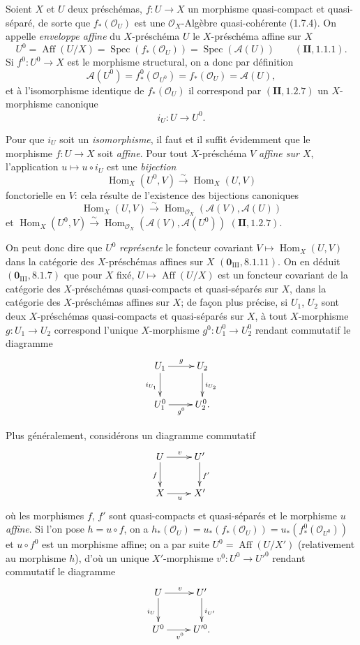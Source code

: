 \begin{env}[21.12.1]
\label{IV.21.12.1}
Soient $X$ et $U$ deux préschémas, $f:U\to X$ un morphisme quasi-compact et
quasi-séparé, de sorte que $f_*(\mathcal O_U)$ est une $\mathcal O_X$-Algèbre
quasi-cohérente (1.7.4). On appelle \emph{enveloppe affine} du $X$-préschéma $U$ le
$X$-préschéma affine sur $X$
\[
  U^0=\operatorname{Aff}(U/X)=\operatorname{Spec}(f_*(\mathcal O_U))
  =\operatorname{Spec}(\mathscr A(U))\qquad(\mathbf{II}, 1.1.1).
\]
Si $f^0:U^0\to X$ est le morphisme structural, on a donc par définition
\[
  \mathscr A(U^0)=f^0_*(\mathcal O_{U^0})=f_*(\mathcal O_U)=\mathscr A(U),
\]
et à l'isomorphisme identique de $f_*(\mathcal O_U)$ il correspond par
$(\mathbf{II}, 1.2.7)$ un $X$-morphisme canonique
\[
\label{IV.21.12.1.1}
  i_U:U\to U^0.
  \tag{21.12.1.1}
\]

Pour que $i_U$ soit un \emph{isomorphisme}, il faut et il suffit évidemment que le
morphisme $f:U\to X$ soit \emph{affine}. Pour tout $X$-préschéma $V$ \emph{affine sur
$X$}, l'application $u\mapsto u\circ i_U$ est une \emph{bijection}
\[
  \operatorname{Hom}_X(U^0,V)\xrightarrow{\sim}\operatorname{Hom}_X(U,V)
\]
fonctorielle en $V$: cela résulte de l'existence des bijections canoniques
\[
  \operatorname{Hom}_X(U,V)\xrightarrow{\sim}
  \operatorname{Hom}_{\mathcal O_X}(\mathscr A(V),\mathscr A(U))
\]
et
$\operatorname{Hom}_X(U^0,V)\xrightarrow{\sim}
\operatorname{Hom}_{\mathcal O_X}(\mathscr A(V),\mathscr A(U^0))$
$(\mathbf{II}, 1.2.7)$.

On peut donc dire que $U^0$ \emph{représente} le foncteur covariant
$V\mapsto\operatorname{Hom}_X(U,V)$ dans la catégorie des $X$-préschémas affines sur
$X$ $(\mathbf 0_{\mathrm{III}}, 8.1.11)$. On en déduit
$(\mathbf 0_{\mathrm{III}}, 8.1.7)$ que pour $X$ fixé,
$U\mapsto\operatorname{Aff}(U/X)$ est un foncteur covariant de la catégorie des
$X$-préschémas quasi-compacts et quasi-séparés sur $X$, dans la catégorie des
$X$-préschémas affines sur $X$; de façon plus précise, si $U_1$, $U_2$ sont deux
$X$-préschémas quasi-compacts et quasi-séparés sur $X$, à tout $X$-morphisme
$g:U_1\to U_2$ correspond l'unique $X$-morphisme $g^0:U_1^0\to U_2^0$ rendant
commutatif le diagramme
\[
  \xymatrix{
    U_1 \ar[r]^g \ar[d]_{i_{U_1}} & U_2 \ar[d]^{i_{U_2}} \\
    U_1^0 \ar[r]_{g^0} & U_2^0.
  }
\]
\end{env}

Plus généralement, considérons un diagramme commutatif
\[
  \xymatrix{
    U \ar[r]^v \ar[d]_f & U' \ar[d]^{f'} \\
    X \ar[r]_u & X'
  }
\]
où les morphismes $f$, $f'$ sont quasi-compacts et quasi-séparés et le morphisme $u$
\emph{affine}. Si l'on pose $h=u\circ f$, on a
$h_*(\mathcal O_U)=u_*(f_*(\mathcal O_U))=u_*(f^0_*(\mathcal O_{U^0}))$ et
$u\circ f^0$ est un morphisme affine; on a par suite
$U^0=\operatorname{Aff}(U/X')$ (relativement au morphisme $h$), d'où un unique
$X'$-morphisme $v^0:U^0\to U'^0$ rendant commutatif le diagramme
\[
  \xymatrix{
    U \ar[r]^v \ar[d]_{i_U} & U' \ar[d]^{i_{U'}} \\
    U^0 \ar[r]_{v^0} & U'^0.
  }
\]

